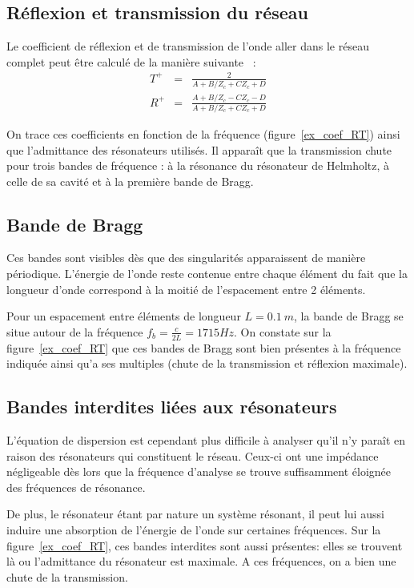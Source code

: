 \subsection{Réflexion et transmission du réseau}
Le coefficient de réflexion et de transmission de l'onde aller dans le réseau complet peut être calculé de la manière suivante ~\cite{guide_dalmont}: 
\begin{eqnarray}
T^{+} & = & \frac{2}{A + B/Z_c + C Z_c + D} \\
R^{+} & = & \frac{A + B / Z_c - C Z_c -D}{A + B/Z_c + C Z_c + D} 
\end{eqnarray}

On trace ces coefficients en fonction de la fréquence (figure~\ref{ex_coef_RT}) ainsi que l'admittance des résonateurs utilisés. Il apparaît que la transmission chute pour trois bandes de fréquence : à la résonance du résonateur de Helmholtz, à celle de sa cavité et à la première bande de Bragg.

\subsection{Bande de Bragg}
Ces bandes sont visibles dès que des singularités apparaissent de manière périodique. L'énergie de l'onde reste contenue entre chaque élément du fait que la longueur d'onde correspond à la moitié de l'espacement entre 2 éléments. 

Pour un espacement entre éléments de longueur $L=0.1~m$, la bande de Bragg se situe autour de la fréquence $f_{b} = \frac{c}{2L} = 1715 Hz$. On constate sur la figure~\ref{ex_coef_RT} que ces bandes de Bragg sont bien présentes à la fréquence indiquée ainsi qu'a ses multiples (chute de la transmission et réflexion maximale).
 

\subsection{Bandes interdites liées aux résonateurs}
L'équation de dispersion est cependant plus difficile à analyser qu'il n'y paraît en raison des résonateurs qui constituent le réseau. Ceux-ci ont une impédance négligeable dès lors que la fréquence d'analyse se trouve suffisamment éloignée des fréquences de résonance. 

De plus, le résonateur étant par nature un système résonant, il peut lui aussi induire une absorption de l'énergie de l'onde sur certaines fréquences. Sur la figure~\ref{ex_coef_RT}, ces bandes interdites sont aussi présentes: elles se trouvent là ou l'admittance du résonateur est maximale. A ces fréquences, on a bien une chute de la transmission.

